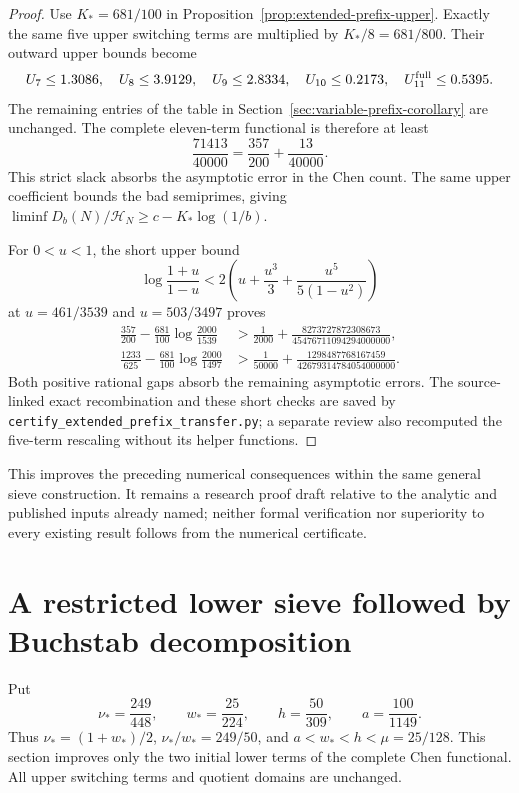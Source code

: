 \documentclass[11pt]{article}
\newcommand{\HN}{\mathcal H_N}
\begin{document}
\begin{proof}
Use $K_*=681/100$ in Proposition~\ref{prop:extended-prefix-upper}.
Exactly the same five upper switching terms are multiplied by
$K_*/8=681/800$. Their outward upper bounds become
\[
 U_7\le1.3086,\quad U_8\le3.9129,\quad U_9\le2.8334,
 \quad U_{10}\le0.2173,\quad U_{11}^{\rm full}\le0.5395.
\]
The remaining entries of the table in
Section~\ref{sec:variable-prefix-corollary} are unchanged.
The complete eleven-term functional is therefore at least
\[
 \frac{71413}{40000}
 =\frac{357}{200}+\frac{13}{40000}.
\]
This strict slack absorbs the asymptotic error in the Chen count.
The same upper coefficient bounds the bad semiprimes, giving
$\liminf D_b(N)/\HN\ge c-K_*\log(1/b)$.

For $0<u<1$, the short upper bound
\[
 \log\frac{1+u}{1-u}
 <2\left(u+\frac{u^3}{3}+\frac{u^5}{5(1-u^2)}\right)
\]
at $u=461/3539$ and $u=503/3497$ proves
\begin{align*}
 \frac{357}{200}-\frac{681}{100}\log\frac{2000}{1539}
 &>\frac1{2000}
   +\frac{8273727872308673}{45476711094294000000},\\
 \frac{1233}{625}-\frac{681}{100}\log\frac{2000}{1497}
 &>\frac1{50000}
   +\frac{1298487768167459}{42679314784054000000}.
\end{align*}
Both positive rational gaps absorb the remaining asymptotic errors.
The source-linked exact recombination and these short checks are
saved by \texttt{certify\_extended\_prefix\_transfer.py}; a separate
review also recomputed the five-term rescaling without its helper
functions.
\end{proof}

This improves the preceding numerical consequences within the
same general sieve construction. It remains a research proof
draft relative to the analytic and published inputs already named;
neither formal verification nor superiority to every existing
result follows from the numerical certificate.

\section{A restricted lower sieve followed by Buchstab decomposition}
\label{sec:buchstab-restricted-lower}

Put
\[
 \nu_* =\frac{249}{448},\qquad w_* =\frac{25}{224},
 \qquad h=\frac{50}{309},\qquad a=\frac{100}{1149}.
\]
Thus $\nu_*=(1+w_*)/2$, $\nu_*/w_*=249/50$, and
$a<w_*<h<\mu=25/128$. This section improves only the two
initial lower terms of the complete Chen functional. All
upper switching terms and quotient domains are unchanged.
\end{document}
